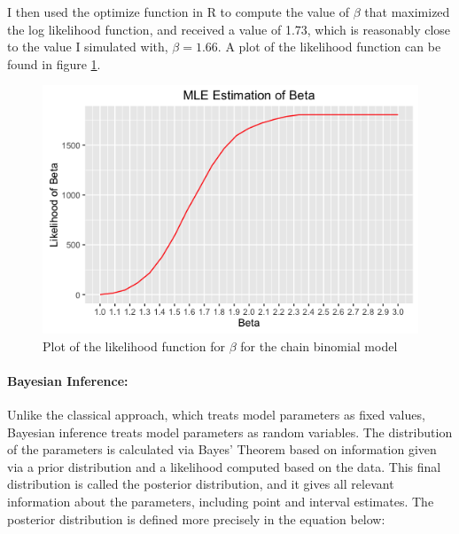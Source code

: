\documentclass{article}
\begin{document}
I then used the optimize function in R to compute the value of $\beta$ that maximized the log likelihood function, and received a value of 1.73, which is reasonably close to the value I simulated with, $\beta=1.66$. A plot of the likelihood function can be found in figure \ref{fig:ChainBinomMLE}.

\begin{figure}[htbp]
\includegraphics[scale=.5, center]{ChainBinomMLE.png}
\caption{Plot of the likelihood function for $\beta$ for the chain binomial model}
\label{fig:ChainBinomMLE}
\end{figure}

\paragraph{Bayesian Inference:}


Unlike the classical approach, which treats model parameters as fixed values, Bayesian inference treats model parameters as random variables. The distribution of the parameters is calculated via Bayes' Theorem based on information given via a prior distribution and a likelihood computed based on the data. This final distribution is called the posterior distribution, and it gives all relevant information about the parameters, including point and interval estimates. The posterior distribution is defined more precisely in the equation below:
\end{document}

